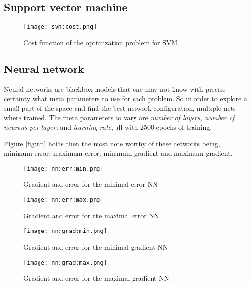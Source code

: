 
\subsection{Support vector machine}

\begin{figure*}[ht]
    \begin{subfigure}[t]{0.49\linewidth}
        \texttt{[image: svn:cost.png]}
        \caption{Cost function of the optimization problem for SVM
        \label{fig:svn:cost}}
    \end{subfigure}

\end{figure*}

\subsection{Neural network}

Neural networks are blackbox models that one may not know with precise certainty
what meta parameters to use for each problem. So in order to explore a small
part of the space and find the best network configuration, multiple nets where
trained. The meta parameters to vary are \textit{number of layers, number of
neurons per layer,} and \textit{learning rate}, all with 2500 epochs of
training. 

Figure \ref{fig:nn} holds then the most note worthy of these networks
being, minimum error, maximum error, minimum gradient and maximum gradient.

\begin{figure*}[ht]
    \begin{subfigure}[t]{0.49\linewidth}
        \texttt{[image: nn:err:min.png]}
        \caption{Gradient and error for the minimal error NN
        \label{fig:nn:err:min}}
    \end{subfigure}
    \hfill
    \begin{subfigure}[t]{0.49\linewidth}
        \texttt{[image: nn:err:max.png]}
        \caption{Gradient and error for the maximal error NN
        \label{fig:nn:err:max}}
    \end{subfigure}
    
    \begin{subfigure}[b]{0.49\linewidth}
        \texttt{[image: nn:grad:min.png]}
        \caption{Gradient and error for the minimal gradient NN
        \label{fig:nn:grad:min}}
    \end{subfigure}
    \hfill
    \begin{subfigure}[b]{0.49\linewidth}
        \texttt{[image: nn:grad:max.png]}
        \caption{Gradient and error for the maximal gradient NN
        \label{fig:nn:grad:max}}
    \end{subfigure}
    \caption{Gradient and error of the most notable NN obtained 
        \label{fig:nn}}
\end{figure*}

